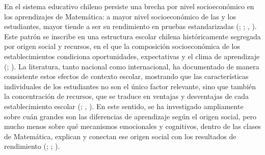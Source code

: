 \documentclass[
  spanish,
  a4paper,
  oneside]{scrbook}
\begin{document}
En el sistema educativo chileno persiste una brecha por nivel
socioeconómico en los aprendizajes de Matemática: a mayor nivel
socioeconómico de las y los estudiantes, mayor tiende a ser su
rendimiento en pruebas estandarizadas
(;
;
,
). Este patrón se inscribe en una
estructura escolar chilena históricamente segregada por origen social y
recursos, en el que la composición socioeconómica de los
establecimientos condiciona oportunidades, expectativas y el clima de
aprendizaje (; ). La literatura, tanto nacional como internacional, ha documentado
de manera consistente estos efectos de contexto escolar, mostrando que
las características individuales de los estudiantes no son el único
factor relevante, sino que también la concentración de recursos, que se
traduce en ventajas y desventajas de cada establecimiento escolar
(;
,
). En este sentido, se ha investigado
ampliamente sobre cuán grandes son las diferencias de aprendizaje según
el origen social, pero mucho menos sobre qué mecanismos emocionales y
cognitivos, dentro de las clases de Matemática, explican y conectan ese
origen social con los resultados de rendimiento
(;
;
).
\end{document}
